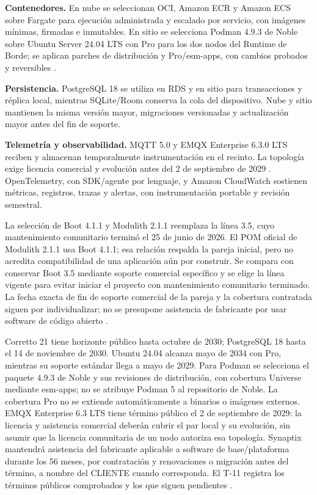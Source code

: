 \textbf{Contenedores.} En nube se seleccionan OCI, Amazon ECR y Amazon ECS sobre Fargate para ejecución administrada y escalado por servicio, con imágenes mínimas, firmadas e inmutables. En sitio se selecciona Podman 4.9.3 de Noble sobre Ubuntu Server 24.04 LTS con Pro para los dos nodos del Runtime de Borde; se aplican parches de distribución y Pro/esm-apps, con cambios probados y reversibles \parencites{p3-ubuntu-ciclo,p3-podman}.

\textbf{Persistencia.} PostgreSQL 18 se utiliza en RDS y en sitio para transacciones y réplica local, mientras SQLite/Room conserva la cola del dispositivo. Nube y sitio mantienen la misma versión mayor, migraciones versionadas y actualización mayor antes del fin de soporte.

\textbf{Telemetría y observabilidad.} MQTT 5.0 y EMQX Enterprise 6.3.0 LTS reciben y almacenan temporalmente instrumentación en el recinto. La topología exige licencia comercial y evolución antes del 2 de septiembre de 2029 \parencite{p3-emqx-ciclo}. OpenTelemetry, con SDK/agente por lenguaje, y Amazon CloudWatch sostienen métricas, registros, trazas y alertas, con instrumentación portable y revisión semestral.

La selección de Boot 4.1.1 y Modulith 2.1.1 reemplaza la línea 3.5, cuyo mantenimiento comunitario terminó el 25 de junio de 2026. El POM oficial de Modulith 2.1.1 usa Boot 4.1.1; esa relación respalda la pareja inicial, pero no acredita compatibilidad de una aplicación aún por construir. Se compara con conservar Boot 3.5 mediante soporte comercial específico y se elige la línea vigente para evitar iniciar el proyecto con mantenimiento comunitario terminado. La fecha exacta de fin de soporte comercial de la pareja y la cobertura contratada siguen por individualizar; no se presupone asistencia de fabricante por usar software de código abierto \parencites{p3-boot35-fin,p3-modulith,p3-spring-soporte}.

Corretto 21 tiene horizonte público hasta octubre de 2030; PostgreSQL 18 hasta el 14 de noviembre de 2030. Ubuntu 24.04 alcanza mayo de 2034 con Pro, mientras su soporte estándar llega a mayo de 2029. Para Podman se selecciona el paquete 4.9.3 de Noble y sus revisiones de distribución, con cobertura Universe mediante esm-apps; no se atribuye Podman 5 al repositorio de Noble. La cobertura Pro no se extiende automáticamente a binarios o imágenes externos. EMQX Enterprise 6.3 LTS tiene término público el 2 de septiembre de 2029: la licencia y asistencia comercial deberán cubrir el par local y su evolución, sin asumir que la licencia comunitaria de un nodo autoriza esa topología. Synaptix mantendrá asistencia del fabricante aplicable a software de base/plataforma durante los 56 meses, por contratación y renovaciones o migración antes del término, a nombre del CLIENTE cuando corresponda. El T-11 registra los términos públicos comprobados y los que siguen pendientes \parencites{p3-corretto,p3-postgresql,p3-ubuntu-ciclo,p3-podman,p3-esm,p3-emqx-ciclo,p3-emqx-licencia}[secc.~8.4, pp.~19--20]{pucv-transversal}.

